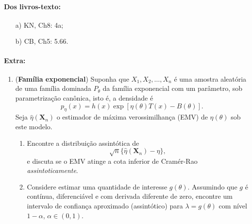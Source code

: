 \documentclass[a4paper,10pt, notitlepage]{report}
\newcommand{\rs}{X_1, X_2, \ldots, X_n} %
\newcommand{\bX}{\boldsymbol{X}} %
\begin{document}
\paragraph{Dos livros-texto:}

\begin{itemize}
    \item[a)] KN, Ch8: 4a;  
    \item[b)] CB, Ch5: 5.66. 
\end{itemize}

\paragraph{Extra:}

\begin{enumerate} 
\item (\textbf{Família exponencial}) Suponha que $\rs$ é uma amostra aleatória de uma família dominada $P_\theta$ da família exponencial com um parâmetro, sob parametrização canônica, isto é, a densidade é 
\begin{equation*}
    p_\eta(x) = h(x)\exp\left[\eta(\theta) T(x) - B(\theta)\right].
\end{equation*}
Seja $\hat{\eta}(\bX_n)$ o estimador de máxima verossimilhança  (EMV) de $\eta(\theta)$ sob este modelo.
\begin{enumerate}
    \item Encontre a distribuição assintótica de 
\begin{equation*}
    \sqrt{n}\{\hat{\eta}(\bX_n)-\eta\},
\end{equation*}
e discuta se o EMV atinge a cota inferior de Cramér-Rao \textit{assintoticamente}.
    \item  Considere estimar uma quantidade de interesse $g(\theta)$. 
    Assumindo que $g$ é contínua, diferenciável e com derivada diferente de zero, encontre um intervalo de confiança aproximado (assintótico) para $\lambda = g(\theta)$ com nível $1-\alpha$, $\alpha \in (0, 1)$.
\end{enumerate}


\end{enumerate}
\end{document}
